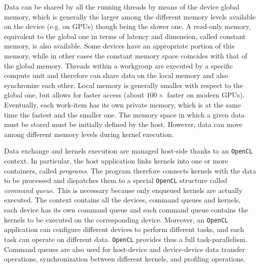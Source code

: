     Data can be shared by all the running threads by means of the
    device global memory, which is generally the larger among the
    different memory levels available on the device (e.g. on GPUs)
    though being the slower one. A read-only memory, equivalent to the
    global one in terms of latency and dimension, called constant
    memory, is also available. Some devices have an appropriate
    portion of this memory, while in other cases the constant memory
    space coincides with that of the global memory. Threads within a
    workgroup are executed by a specific compute unit and therefore
    can share data on the local memory and also synchronize each
    other. Local memory is generally smaller with respect to the
    global one, but allows for faster access (about $100\times$ faster
    on modern GPUs). Eventually, each work-item has its own private
    memory, which is at the same time the fastest and the smaller
    one. The memory space in which a given data must be stored must be
    initially defined by the host. However, data can move among
    different memory levels during kernel execution.
    
    Data exchange and kernels execution are managed host-side thanks
    to an \texttt{OpenCL} context. In particular, the host application links
    kernels into one or more containers, called \emph{programs}. The
    program therefore connects kernels with the data to be processed
    and dispatches them to a special \texttt{OpenCL} structure called
    \emph{command queue}. This is necessary because only enqueued
    kernels are actually executed. The context contains all the
    devices, command queues and kernels, each device has its own
    command queue and each command queue contains the kernels to be
    executed on the corresponding device. Moreover, an \texttt{OpenCL}
    application can configure different devices to perform different
    tasks, and each task can operate on different data. \texttt{OpenCL}
    provides thus a full task-parallelism. Command queues are also
    used for host-device and device-device data transfer operations,
    synchronization between different kernels, and profiling
    operations.
    